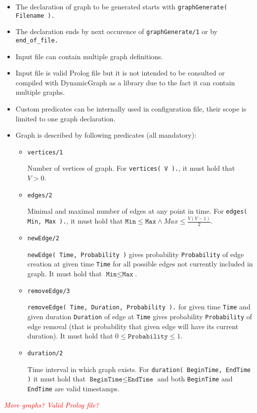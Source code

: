 \documentclass[11pt, a4paper,draft]{article}
\newcommand{\pl}[1]{\texttt{#1}} %
\theoremstyle{plain}
\theoremstyle{definition}
\theoremstyle{remark}
\newcommand{\qq}[1]{\textit{\textcolor{red}{#1}}}
\begin{document}
\begin{itemize}
    \item The declaration of graph to be generated starts with \pl{graphGenerate( Filename ).}
    \item The declaration ends by next occurence of \pl{graphGenerate/1} or by
        \pl{end\_of\_file.}
    \item Input file can contain multiple graph definitions.
    \item Input file is valid Prolog file but it is not intended to be consulted or
        compiled with DynamicGraph as a library due to the fact it can contain multiple
        graphs.
    \item Custom predicates can be internally used in configuration file, their scope
        is limited to one graph declaration.
    \item Graph is described by following predicates (all mandatory): 
        \begin{itemize}
            \item \pl{vertices/1}

                Number of vertices of graph. For \pl{vertices( V ).}, it must hold that $V > 0$.
            \item \pl{edges/2}

                Minimal and maximal number of edges at any point in time.
                For \pl{edges( Min, Max ).}, it must hold that
                $\pl{Min} \le \pl{Max} \land Max \le \frac{ V(V-1)}{2}$.
            \item \pl{newEdge/2}

                \pl{newEdge( Time, Probability )} gives probability \pl{Probability} of
                edge creation at given time \pl{Time} for all possible edges not currently
                included in graph. It must hold that $\pl{Min} \le \pl{Max}$.
            \item \pl{removeEdge/3}
                
                \pl{removeEdge( Time, Duration, Probability ).} for given time \pl{Time}
                and given duration \pl{Duration} of edge at \pl{Time} gives
                probability \pl{Probability} of edge removal (that is probability
                that given edge will have its current duration).
                It must hold that $0 \le \pl{Probability} \le 1$.
            \item \pl{duration/2}

                Time interval in which graph exists. For \pl{duration( BeginTime, EndTime )}
                it must hold that  $\pl{BeginTime} \le \pl{EndTime}$ and both
                \pl{BeginTime} and \pl{EndTime} are valid timestamps.
        \end{itemize}

\end{itemize}
\qq{More graphs? Valid Prolog file?}
\end{document}
